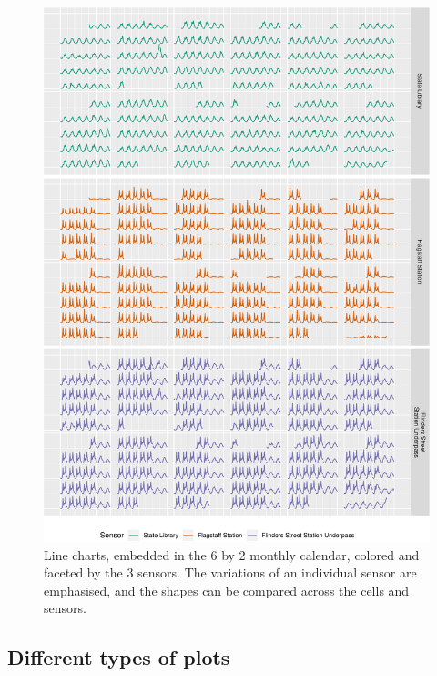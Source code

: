 \begin{Schunk}
\begin{figure}

{\centering \includegraphics[width=\textwidth]{figure/facet-1} 

}

\caption[Line charts, embedded in the 6 by 2 monthly calendar, colored and faceted by the 3 sensors]{Line charts, embedded in the 6 by 2 monthly calendar, colored and faceted by the 3 sensors. The variations of an individual sensor are emphasised, and the shapes can be compared across the cells and sensors.}\label{fig:facet}
\end{figure}
\end{Schunk}

\hypertarget{different-types-of-plots}{%
\subsection{Different types of plots}\label{different-types-of-plots}}


